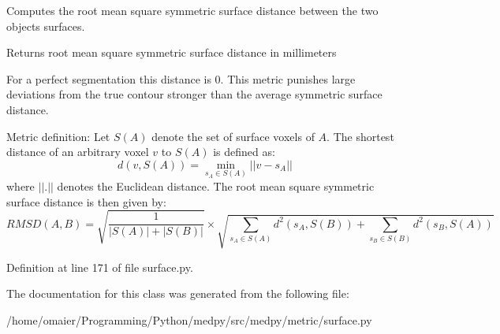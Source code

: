 Computes the root mean square symmetric surface distance between the two objects surfaces. 

\begin{DoxyReturn}{Returns}
root mean square symmetric surface distance in millimeters
\end{DoxyReturn}
For a perfect segmentation this distance is 0. This metric punishes large deviations from the true contour stronger than the average symmetric surface distance.

Metric definition: Let $S(A)$ denote the set of surface voxels of $A$. The shortest distance of an arbitrary voxel $v$ to $S(A)$ is defined as: \[ d(v,S(A)) = \min_{s_A\in S(A)} ||v-s_A|| \] where $||.||$ denotes the Euclidean distance. The root mean square symmetric surface distance is then given by: \[ RMSD(A,B) = \sqrt{\frac{1}{|S(A)|+|S(B)|}} \times \sqrt{ \sum_{s_A\in S(A)} d^2(s_A,S(B)) + \sum_{s_B\in S(B)} d^2(s_B,S(A)) } \] 

Definition at line 171 of file surface.py.



The documentation for this class was generated from the following file:\begin{DoxyCompactItemize}
\item 
/home/omaier/Programming/Python/medpy/src/medpy/metric/surface.py\end{DoxyCompactItemize}
